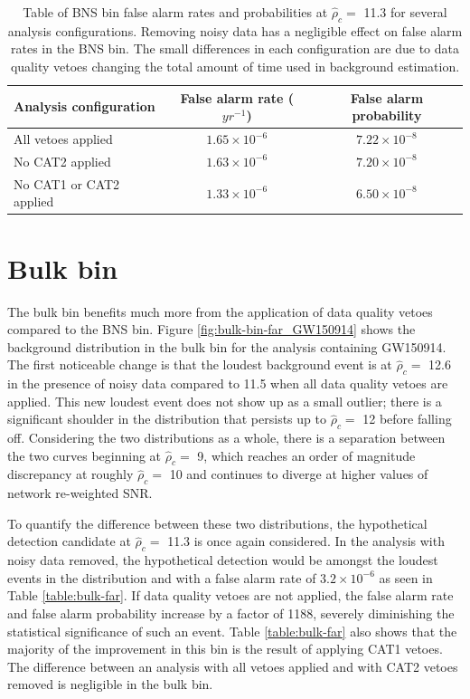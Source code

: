 \begin{table}[!ht]%
  \begin{center}
    \begin{tabular}{lcc}
      \hline
      Analysis configuration & False alarm rate ($yr^{-1}$) & False alarm probability \\ \hline
      All vetoes applied & $1.65\times10^{-6}$ & $7.22\times10^{-8}$ \\
      No CAT2 applied & $1.63\times10^{-6}$ & $7.20\times10^{-8}$\\
      No CAT1 or CAT2 applied & $1.33\times10^{-6}$ & $6.50\times10^{-8}$\\
      \hline
    \end{tabular}
  \end{center}
  \caption[BNS bin FAR - GW150914 analysis]{Table of BNS bin false alarm rates and probabilities at $\hat{\rho}_{c} =$ 11.3 %
           for several analysis configurations. %
           Removing noisy data has a negligible effect on false alarm rates in the BNS bin. %
           The small differences in each configuration are due to data quality vetoes %
           changing the total amount of time used in background estimation.
           }
  \label{table:bns-far}
\end{table}

\section{Bulk bin}\label{sec:bulk-bin}

The bulk bin benefits much more from the application of data quality vetoes compared to the
BNS bin.
Figure \ref{fig:bulk-bin-far_GW150914} shows the background distribution in the bulk
bin for the analysis containing GW150914.
The
first noticeable change is that the loudest background event is at $\hat{\rho}_{c} =$
12.6 in the presence of noisy data compared to 11.5 when all data quality vetoes
are applied. This new loudest
event does not show up as a small outlier; there is a significant shoulder in the distribution that
persists up to $\hat{\rho}_{c} =$ 12 before falling off. Considering the two distributions as a whole,
there is a separation between the two curves beginning at $\hat{\rho}_{c} =$ 9, which reaches
an order of magnitude discrepancy at roughly $\hat{\rho}_{c} =$ 10 and continues to diverge at higher
values of network re-weighted SNR.

To quantify the difference between these two distributions, the hypothetical detection candidate at
$\hat{\rho}_{c} =$ 11.3 is
once again considered. In the analysis with noisy data removed, the hypothetical detection would be
amongst the loudest events in the distribution and with a false alarm rate of
$3.2\times10^{-6}$ as seen in Table \ref{table:bulk-far}. If data quality vetoes are
not applied,
the false alarm rate and false alarm probability increase by a factor of 1188,
severely diminishing the statistical significance of such an event.
Table \ref{table:bulk-far} also shows that the majority of the improvement in this bin
is the result of applying CAT1 vetoes. The difference between an analysis with all vetoes
applied and with CAT2 vetoes removed is negligible in the bulk bin.

